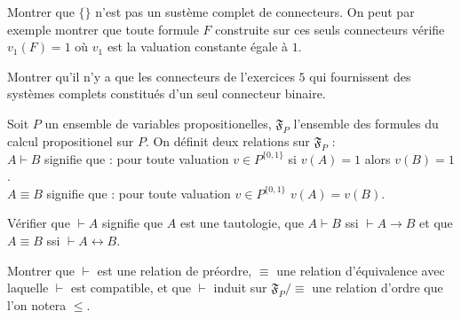 \documentclass[french]{report}
\begin{document}
\begin{exo}
    Montrer que \(\{\}\) n'est pas un sustème complet de connecteurs. On peut
    par exemple montrer que toute formule \(F\) construite sur ces seuls connecteurs
    vérifie \(v_1(F)=1\) où \(v_1\) est la valuation constante égale à \(1\).
\end{exo}

\begin{exo}
    Montrer qu'il n'y a que les connecteurs de l'exercices \(5\) qui fournissent
    des systèmes complets constitués d'un seul connecteur binaire.
\end{exo}

\begin{exo}
    Soit \(P\) un ensemble de variables propositionelles, \(\mathfrak{F}_P\) l'ensemble
    des formules du calcul propositionel sur \(P\). On définit deux relations sur
    \(\mathfrak{F}_P\) :\smallskip\\
    \(A\vdash B\) signifie que : pour toute valuation \(v\in P^{\{0,1\}}\) si
    \(v(A)=1\) alors \(v(B)=1\).\\
    \(A\equiv B\) signifie que : pour toute valuation \(v\in P^{\{0,1\}}\) \(v(A)=v(B)\).
    \begin{q}{1}
        Vérifier que \(\vdash A\) signifie que \(A\) est une tautologie, que \(A\vdash B\)
        ssi \(\vdash A\rightarrow B\) et que \(A\equiv B\) ssi \(\vdash A\leftrightarrow B\).
    \end{q}
    \begin{q}{2}
        Montrer que \(\vdash\) est une relation de préordre, \(\equiv\) une relation
        d'équivalence avec laquelle \(\vdash\) est compatible, et que \(\vdash\)
        induit sur \(\mathfrak{F}_P/\equiv\) une relation d'ordre que l'on notera \(\leq\).
    \end{q} 
\end{exo}
\end{document}
